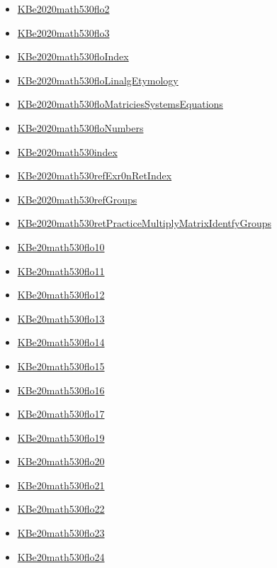 \documentclass[11pt]{article}
\begin{document}
\begin{itemize}
\begin{itemize}
\item \href{math530/KBe2020math530flo2.org}{KBe2020math530flo2}
\item \href{math530/KBe2020math530flo3.org}{KBe2020math530flo3}
\item \href{math530/KBe2020math530floIndex.org}{KBe2020math530floIndex}
\item \href{math530/KBe2020math530floLinalgEtymology.org}{KBe2020math530floLinalgEtymology}
\item \href{math530/KBe2020math530floMatriciesSystemsEquations.org}{KBe2020math530floMatriciesSystemsEquations}
\item \href{math530/KBe2020math530floNumbers.org}{KBe2020math530floNumbers}
\item \href{math530/KBe2020math530index.org}{KBe2020math530index}
\item \href{math530/KBe2020math530refExr0nRetIndex.org}{KBe2020math530refExr0nRetIndex}
\item \href{math530/KBe2020math530refGroups.org}{KBe2020math530refGroups}
\item \href{math530/KBe2020math530retPracticeMultiplyMatrixIdentfyGroups.org}{KBe2020math530retPracticeMultiplyMatrixIdentfyGroups}
\item \href{math530/KBe20math530flo10.org}{KBe20math530flo10}
\item \href{math530/KBe20math530flo11.org}{KBe20math530flo11}
\item \href{math530/KBe20math530flo12.org}{KBe20math530flo12}
\item \href{math530/KBe20math530flo13.org}{KBe20math530flo13}
\item \href{math530/KBe20math530flo14.org}{KBe20math530flo14}
\item \href{math530/KBe20math530flo15.org}{KBe20math530flo15}
\item \href{math530/KBe20math530flo16.org}{KBe20math530flo16}
\item \href{math530/KBe20math530flo17.org}{KBe20math530flo17}
\item \href{math530/KBe20math530flo19.org}{KBe20math530flo19}
\item \href{math530/KBe20math530flo20.org}{KBe20math530flo20}
\item \href{math530/KBe20math530flo21.org}{KBe20math530flo21}
\item \href{math530/KBe20math530flo22.org}{KBe20math530flo22}
\item \href{math530/KBe20math530flo23.org}{KBe20math530flo23}
\item \href{math530/KBe20math530flo24.org}{KBe20math530flo24}

\end{itemize}
\end{itemize}
\end{document}
